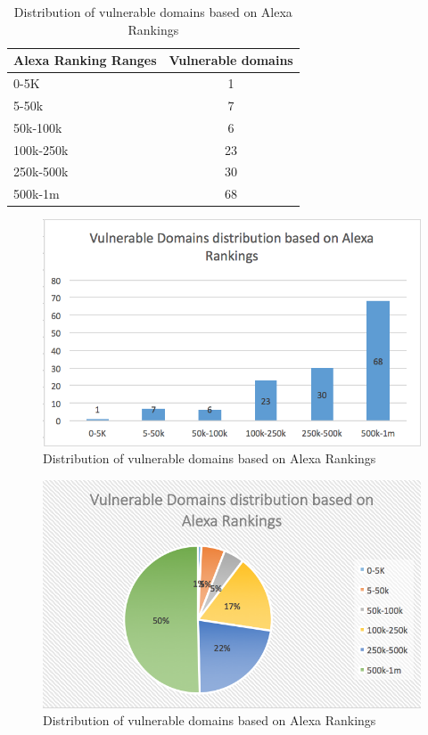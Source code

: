 \begin{table}[tbp]
	\centering
	\scriptsize
	\begin{tabular}{|l|c|}
		\hline
		\textbf{Alexa Ranking Ranges} & \textbf{Vulnerable domains} \\
		\hline
		0-5K & 1 \\
		\hline
		5-50k & 7 \\
		\hline
		50k-100k & 6 \\
		\hline
		100k-250k & 23 \\
		\hline
		250k-500k & 30 \\
		\hline
		500k-1m & 68 \\
		\hline		
	\end{tabular}
	\caption[]{Distribution of vulnerable domains based on Alexa Rankings}
	\vspace{-5ex}
	\label{tab:alexa}
\end{table}

\begin{figure}
	\centering
	\includegraphics[width=.5\textwidth]{alexa_data_bar}
	\caption{Distribution of vulnerable domains based on Alexa Rankings}
	\label{fig:alexa_data_bar}
\end{figure}

\begin{figure}
	\centering
	\includegraphics[width=.5\textwidth]{alexa_data_pie}
	\caption{Distribution of vulnerable domains based on Alexa Rankings}
	\label{fig:alexa_data_pie}
\end{figure}